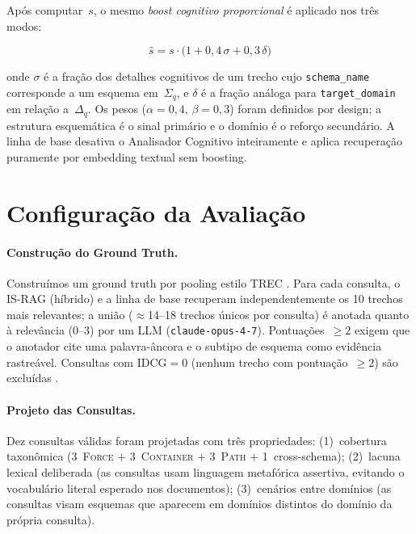 \documentclass[11pt,a4paper]{article}
\begin{document}
Após computar~$s$, o mesmo \emph{boost cognitivo proporcional} é
aplicado nos três modos:

\begin{equation}
  \label{eq:boosting}
  \hat{s} = s \cdot \bigl(1 + 0{,}4\,\sigma + 0{,}3\,\delta\bigr)
\end{equation}

\noindent onde $\sigma$ é a fração dos detalhes cognitivos de um trecho
cujo \texttt{schema\_name} corresponde a um esquema em~$\Sigma_q$,
e $\delta$ é a fração análoga para \texttt{target\_domain}
em relação a~$\Delta_q$.
Os pesos ($\alpha{=}0{,}4$, $\beta{=}0{,}3$) foram definidos por
design; a estrutura esquemática é o sinal primário e o domínio é o
reforço secundário.
A linha de base desativa o Analisador Cognitivo inteiramente e aplica
recuperação puramente por embedding textual sem boosting.

\section{Configuração da Avaliação}
\label{sec:eval}

\paragraph{Construção do Ground Truth.}
Construímos um ground truth por pooling estilo TREC \citep{voorhees2005}.
Para cada consulta, o IS-RAG (híbrido) e a linha de base recuperam
independentemente os 10 trechos mais relevantes; a união
($\approx$14--18 trechos únicos por consulta) é anotada quanto à
relevância (0--3) por um LLM (\texttt{claude-opus-4-7}).
Pontuações~$\geq 2$ exigem que o anotador cite uma palavra-âncora e
o subtipo de esquema como evidência rastreável.
Consultas com IDCG$=0$ (nenhum trecho com pontuação~$\geq 2$) são
excluídas \citep{buckley2004}.

\paragraph{Projeto das Consultas.}
Dez consultas válidas foram projetadas com três propriedades:
(1)~cobertura taxonômica (3~\textsc{Force} $+$ 3~\textsc{Container}
$+$ 3~\textsc{Path} $+$ 1~cross-schema);
(2)~lacuna lexical deliberada (as consultas usam linguagem metafórica
assertiva, evitando o vocabulário literal esperado nos documentos);
(3)~cenários entre domínios (as consultas visam esquemas que aparecem
em domínios distintos do domínio da própria consulta).
\end{document}
